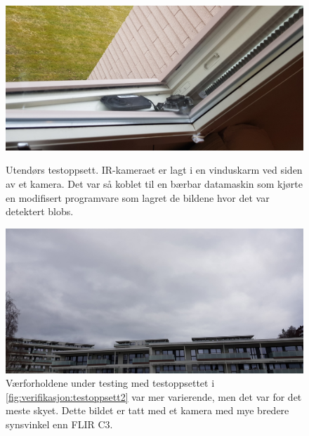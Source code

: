 \begin{figure}[H]
    \centering
    \begin{minipage}{0.48\textwidth}
        \centering
        \includegraphics[width=1\textwidth]{verifikasjon-test/Testoppsett/Testoppsett1.jpg}
        \caption{Utendørs testoppsett. IR-kameraet er lagt i en vinduskarm ved siden av et kamera. Det var så koblet til en bærbar datamaskin som kjørte en modifisert programvare som lagret de bildene hvor det var detektert blobs.}
        \label{fig:verifikasjon:testoppsett2}
    \end{minipage}\hfill
    \begin{minipage}{0.48\textwidth}
        \centering
        \includegraphics[width=1\textwidth]{verifikasjon-test/Testoppsett/Testoppsett3.jpg}
        \caption{Værforholdene under testing med testoppsettet i     \autoref{fig:verifikasjon:testoppsett2} var mer varierende, men det var for det meste skyet. Dette bildet er tatt med et kamera med mye bredere synsvinkel enn FLIR C3.}
        \label{fig:verifikasjon:værTest2}
    \end{minipage}
\end{figure}


